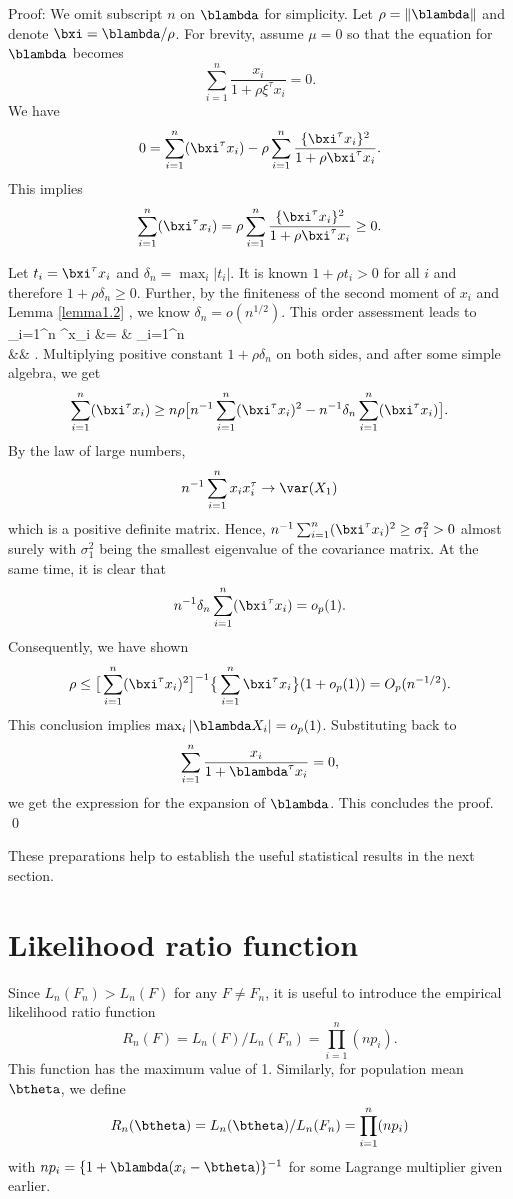 \noindent
{\sc Proof}: 
We omit subscript $n$ on $\blambda$ for simplicity.
Let $\rho = \| \blambda \|$ and denote $\bxi = \blambda / \rho$.
For brevity, assume $\mu = 0$ so that the equation for $\blambda$ becomes
\[
\sum_{i=1}^n \frac{x_i}{1 + \rho \xi^\tau x_i} = 0.
\]
We have
\[
0 =
 \sum_{i=1}^n( \bxi^\tau x_i)- \rho \sum_{i=1}^n \frac{ \{\bxi^\tau x_i\}^2}{ 1 + \rho \bxi^\tau x_i}.
\]
This implies
\[
 \sum_{i=1}^n( \bxi^\tau x_i)= \rho \sum_{i=1}^n \frac{ \{\bxi^\tau x_i\}^2}{ 1 + \rho \bxi^\tau x_i}\geq 0.
 \]
 
Let $t_i = \bxi^\tau x_i$ and $\delta_n = \max_i | t_i|$. 
It is known $1 + \rho t_i > 0$ for all $i$ and therefore
$1 + \rho \delta_n \geq 0$. 
Further, by the finiteness of the second moment of $x_i$ and
Lemma \ref{lemma1.2} , we know $\delta_n = o(n^{1/2})$.
This order assessment leads to
\ba
\sum_{i=1}^n \bxi^\tau  x_i
&= &
\rho \sum_{i=1}^n  \\
&\geq& 
\rho \frac{ [\sum_{i=1}^n \{\bxi^\tau x_i\}^2 }{ 1 +  \rho \delta_n }.
\ea
Multiplying positive constant $1 + \rho \delta_n$ on both sides, 
and after some simple algebra, we get
\[
\sum_{i=1}^n( \bxi^\tau x_i) 
\geq 
n \rho \big [ 
n^{-1} \sum_{i=1}^n( \bxi^\tau x_i)^2 - n^{-1} \delta_n \sum_{i=1}^n( \bxi^\tau x_i) 
\big ].
\]
By the law of large numbers,
\[
n^{-1} \sum_{i=1}^n x_i x_i^\tau  \to \var (X_1)
\]
which is a positive definite matrix. Hence, 
$n^{-1} \sum_{i=1}^n( \bxi^\tau x_i)^2 \geq \sigma_1^2 > 0$ 
almost surely with $\sigma_1^2$
being the smallest eigenvalue of the covariance matrix.
At the same time, it is clear that
\[
n^{-1} \delta_n \sum_{i=1}^n( \bxi^\tau x_i) = o_p(1).
\]
Consequently, we have shown
\[
\rho \leq 
\big [\sum_{i=1}^n( \bxi^\tau x_i)^2\big ]^{-1}
\big \{ \sum_{i=1}^n \bxi^\tau  x_i \big \} (1 + o_p(1))
 = O_p(n^{-1/2}).
 \]
 This conclusion implies $\max_i | \blambda X_i| = o_p(1)$. Substituting back to 
 \[
\sum_{i=1}^n \frac{x_i}{1 + \blambda^\tau x_i} = 0,
\]
we get the expression for the expansion of $\blambda$.
This concludes the proof.
\qed
 
 \vs
These preparations help to establish the useful
statistical results in the next section.

\section{Likelihood ratio function}

Since $L_n(F_n) > L_n(F)$ for any $F \neq F_n$, 
it is useful to introduce the empirical likelihood ratio function
\[
R_n(F) = L_n(F)/L_n(F_n) = \prod_{i=1}^n (np_i).
\]
This function has the maximum value of 1. 
Similarly, for population mean $\btheta$, we define
\[
R_n(\btheta) = L_n(\btheta)/L_n(F_n) = \prod_{i=1}^n (np_i)
\]
with $n p_i = \{ 1 + \blambda (x_i - \btheta)\}^{-1}$ for some
Lagrange multiplier given earlier. 


